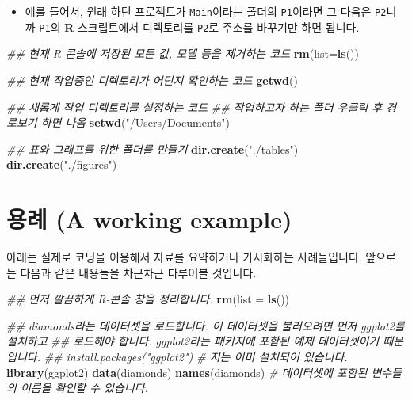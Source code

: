 \documentclass[]{book}
\newenvironment{Shaded}{\begin{snugshade}}{\end{snugshade}}
\newcommand{\CommentTok}[1]{\textcolor[rgb]{0.56,0.35,0.01}{\textit{#1}}}
\newcommand{\DataTypeTok}[1]{\textcolor[rgb]{0.13,0.29,0.53}{#1}}
\newcommand{\KeywordTok}[1]{\textcolor[rgb]{0.13,0.29,0.53}{\textbf{#1}}}
\newcommand{\NormalTok}[1]{#1}
\newcommand{\StringTok}[1]{\textcolor[rgb]{0.31,0.60,0.02}{#1}}
\providecommand{\tightlist}{%
  \setlength{\itemsep}{0pt}\setlength{\parskip}{0pt}}
\begin{document}
\begin{itemize}
\tightlist
\item
  예를 들어서, 원래 하던 프로젝트가 \texttt{Main}이라는 폴더의 \texttt{P1}이라면 그 다음은 \texttt{P2}니까 \texttt{P1}의 \textbf{R} 스크립트에서 디렉토리를 \texttt{P2}로 주소를 바꾸기만 하면 됩니다.
\end{itemize}

\begin{Shaded}
\begin{Highlighting}[]
\CommentTok{## 현재 R 콘솔에 저장된 모든 값, 모델 등을 제거하는 코드}
\KeywordTok{rm}\NormalTok{(}\DataTypeTok{list=}\KeywordTok{ls}\NormalTok{())}

\CommentTok{## 현재 작업중인 디렉토리가 어딘지 확인하는 코드}
\KeywordTok{getwd}\NormalTok{()}

\CommentTok{## 새롭게 작업 디렉토리를 설정하는 코드}
\CommentTok{## 작업하고자 하는 폴더 우클릭 후 경로보기 하면 나옴}
\KeywordTok{setwd}\NormalTok{(}\StringTok{"/Users/Documents"}\NormalTok{)}

\CommentTok{## 표와 그래프를 위한 폴더를 만들기}
\KeywordTok{dir.create}\NormalTok{(}\StringTok{"./tables"}\NormalTok{)}
\KeywordTok{dir.create}\NormalTok{(}\StringTok{"./figures"}\NormalTok{)}
\end{Highlighting}
\end{Shaded}

\hypertarget{uxc6a9uxb840-a-working-example}{%
\section{용례 (A working example)}\label{uxc6a9uxb840-a-working-example}}

아래는 실제로 코딩을 이용해서 자료를 요약하거나 가시화하는 사례들입니다. 앞으로는 다음과 같은 내용들을 차근차근 다루어볼 것입니다.

\begin{Shaded}
\begin{Highlighting}[]
\CommentTok{## 먼저 깔끔하게 R-콘솔 창을 정리합니다.}
\KeywordTok{rm}\NormalTok{(}\DataTypeTok{list =} \KeywordTok{ls}\NormalTok{())}

\CommentTok{## diamonds라는 데이터셋을 로드합니다. 이 데이터셋을 불러오려면 먼저 ggplot2를 설치하고}
\CommentTok{## 로드해야 합니다. ggplot2라는 패키지에 포함된 예제 데이터셋이기 때문입니다.}
\CommentTok{## install.packages("ggplot2") # 저는 이미 설치되어 있습니다.}
\KeywordTok{library}\NormalTok{(ggplot2)}
\KeywordTok{data}\NormalTok{(diamonds)}
\KeywordTok{names}\NormalTok{(diamonds) }\CommentTok{# 데이터셋에 포함된 변수들의 이름을 확인할 수 있습니다.}
\end{Highlighting}
\end{Shaded}
\end{document}
